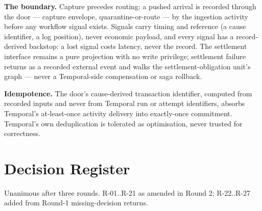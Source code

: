 \documentclass[11pt,a4paper]{article}
\begin{document}
\textbf{The boundary.} Capture precedes routing: a pushed arrival is recorded through
the door --- capture envelope, quarantine-or-route --- by the ingestion activity before
any workflow signal exists. Signals carry timing and reference (a cause identifier, a
log position), never economic payload, and every signal has a record-derived backstop:
a lost signal costs latency, never the record. The settlement interface remains a pure
projection with no write privilege; settlement failure returns as a recorded external
event and walks the settlement-obligation unit's graph --- never a Temporal-side
compensation or saga rollback.

\textbf{Idempotence.} The door's cause-derived transaction identifier, computed from
recorded inputs and never from Temporal run or attempt identifiers, absorbs Temporal's
at-least-once activity delivery into exactly-once commitment. Temporal's own
deduplication is tolerated as optimisation, never trusted for correctness.

\section{Decision Register}

Unanimous after three rounds. R-01..R-21 as amended in Round 2; R-22..R-27 added from
Round-1 missing-decision returns.
\end{document}
